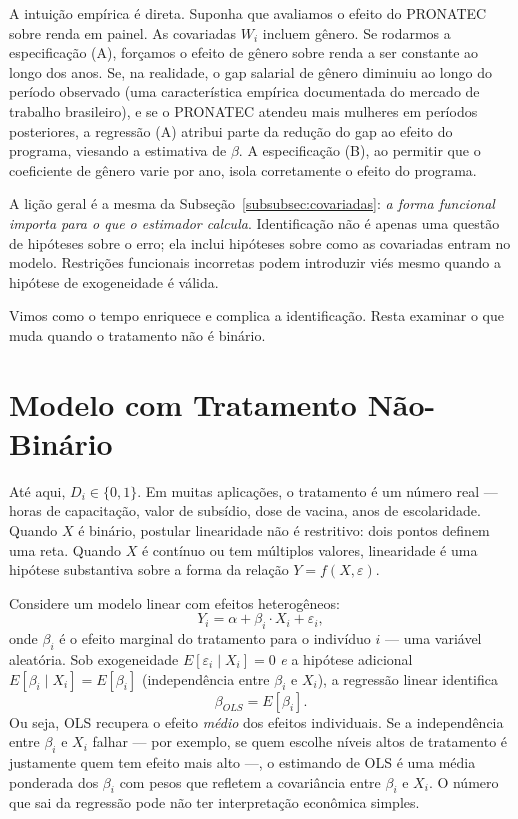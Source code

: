 A intuição empírica é direta. Suponha que avaliamos o efeito do PRONATEC sobre renda em painel. As covariadas $W_i$ incluem gênero. Se rodarmos a especificação (A), forçamos o efeito de gênero sobre renda a ser constante ao longo dos anos. Se, na realidade, o gap salarial de gênero diminuiu ao longo do período observado (uma característica empírica documentada do mercado de trabalho brasileiro), e se o PRONATEC atendeu mais mulheres em períodos posteriores, a regressão (A) atribui parte da redução do gap ao efeito do programa, viesando a estimativa de $\beta$. A especificação (B), ao permitir que o coeficiente de gênero varie por ano, isola corretamente o efeito do programa.

A lição geral é a mesma da Subseção~\ref{subsubsec:covariadas}: \textit{a forma funcional importa para o que o estimador calcula}. Identificação não é apenas uma questão de hipóteses sobre o erro; ela inclui hipóteses sobre como as covariadas entram no modelo. Restrições funcionais incorretas podem introduzir viés mesmo quando a hipótese de exogeneidade é válida.

Vimos como o tempo enriquece e complica a identificação. Resta examinar o que muda quando o tratamento não é binário.

\section{Modelo com Tratamento Não-Binário}
\label{subsec:nao-binario}

Até aqui, $D_i \in \{0, 1\}$. Em muitas aplicações, o tratamento é um número real --- horas de capacitação, valor de subsídio, dose de vacina, anos de escolaridade. Quando $X$ é binário, postular linearidade não é restritivo: dois pontos definem uma reta. Quando $X$ é contínuo ou tem múltiplos valores, linearidade é uma hipótese substantiva sobre a forma da relação $Y = f(X, \varepsilon)$.

Considere um modelo linear com efeitos heterogêneos:
\begin{equation}
Y_i = \alpha + \beta_i \cdot X_i + \varepsilon_i,
\label{eq:linear-heterogeneo}
\end{equation}
onde $\beta_i$ é o efeito marginal do tratamento para o indivíduo $i$ --- uma variável aleatória. Sob exogeneidade $E[\varepsilon_i \mid X_i] = 0$ \textit{e} a hipótese adicional $E[\beta_i \mid X_i] = E[\beta_i]$ (independência entre $\beta_i$ e $X_i$), a regressão linear identifica
\begin{equation}
\beta_{OLS} = E[\beta_i].
\label{eq:beta-medio}
\end{equation}
Ou seja, OLS recupera o efeito \textit{médio} dos efeitos individuais. Se a independência entre $\beta_i$ e $X_i$ falhar --- por exemplo, se quem escolhe níveis altos de tratamento é justamente quem tem efeito mais alto ---, o estimando de OLS é uma média ponderada dos $\beta_i$ com pesos que refletem a covariância entre $\beta_i$ e $X_i$. O número que sai da regressão pode não ter interpretação econômica simples.

